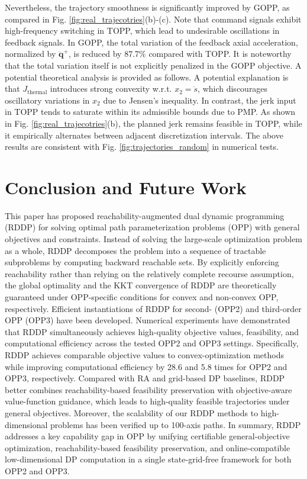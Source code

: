 \documentclass[journal]{IEEEtran}
\theoremstyle{definition}
\theoremstyle{definition}
\renewcommand\vector[1]{\boldsymbol{#1}}
\newcommand\vq{{\vector{q}}}
\begin{document}
Nevertheless, the trajectory smoothness is significantly improved by GOPP, as compared in Fig. \ref{fig:real_trajecotries}(b)-(c). Note that command signals exhibit high-frequency switching in TOPP, which lead to undesirable oscillations in feedback signals. In GOPP, the total variation of the feedback axial acceleration, normalized by $\ddot{\vq}^{+}$, is reduced by 87.7\% compared with TOPP. It is noteworthy that the total variation itself is not explicitly penalized in the GOPP objective. A potential theoretical analysis is provided as follows. A potential explanation is that $J_{\mathrm{thermal}}$ introduces strong convexity w.r.t. $x_2=\ddot{s}$, which discourages oscillatory variations in $x_2$ due to Jensen's inequality. In contrast, the jerk input in TOPP tends to saturate within its admissible bounds due to PMP. As shown in Fig. \ref{fig:real_trajecotries}(b), the planned jerk remains feasible in TOPP, while it empirically alternates between adjacent discretization intervals. The above results are consistent with Fig. \ref{fig:trajectories_random} in numerical tests.

\section{Conclusion and Future Work}

This paper has proposed reachability-augmented dual dynamic programming (RDDP) for solving optimal path parameterization problems (OPP) with general objectives and constraints. Instead of solving the large-scale optimization problem as a whole, RDDP decomposes the problem into a sequence of tractable subproblems by computing backward reachable sets. By explicitly enforcing reachability rather than relying on the relatively complete recourse assumption, the global optimality and the KKT convergence of RDDP are theoretically guaranteed under OPP-specific conditions for convex and non-convex OPP, respectively. Efficient instantiations of RDDP for second- (OPP2) and third-order OPP (OPP3) have been developed. Numerical experiments have demonstrated that RDDP simultaneously achieves high-quality objective values, feasibility, and computational efficiency across the tested OPP2 and OPP3 settings. Specifically, RDDP achieves comparable objective values to convex-optimization methods while improving computational efficiency by 28.6 and 5.8 times for OPP2 and OPP3, respectively. Compared with RA and grid-based DP baselines, RDDP better combines reachability-based feasibility preservation with objective-aware value-function guidance, which leads to high-quality feasible trajectories under general objectives. Moreover, the scalability of our RDDP methods to high-dimensional problems has been verified up to 100-axis paths. In summary, RDDP addresses a key capability gap in OPP by unifying certifiable general-objective optimization, reachability-based feasibility preservation, and online-compatible low-dimensional DP computation in a single state-grid-free framework for both OPP2 and OPP3.
\end{document}
